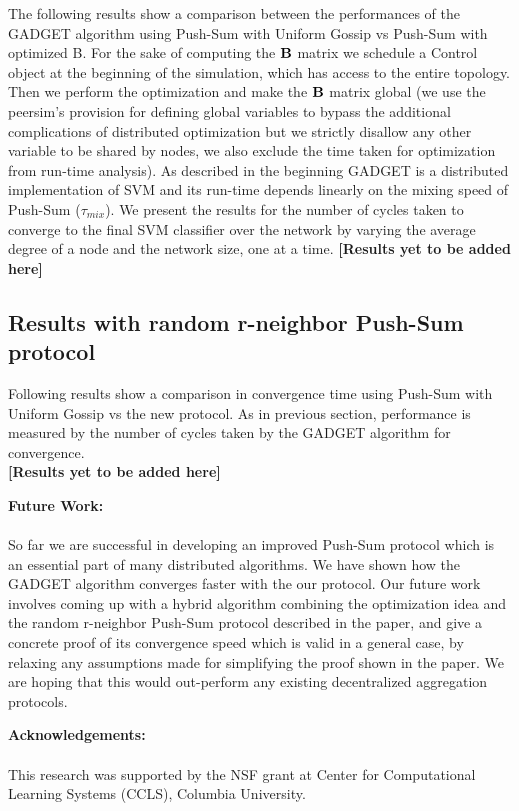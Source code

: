 \documentclass{article}
\begin{document}
The following results show a comparison between the performances of the GADGET algorithm using Push-Sum with Uniform Gossip vs Push-Sum with optimized B. For the sake of computing the $\bf{B}$ matrix we schedule a Control object at the beginning of the simulation, which has access to the entire topology. Then we perform the optimization and make the $\bf{B}$ matrix global (we use the peersim's provision for defining global variables to bypass the additional complications of distributed optimization but we strictly disallow any other variable to be shared by nodes, we also exclude the time taken for optimization from run-time analysis). As described in the beginning GADGET is a distributed implementation of SVM and its run-time depends linearly on the mixing speed of Push-Sum ($\tau_{mix}$). We present the results for the number of cycles taken to converge to the final SVM classifier over the network by varying the average degree of a node and the network size, one at a time.
\textbf{[Results yet to be added here]}

\subsection{Results with random r-neighbor Push-Sum protocol}

Following results show a comparison in convergence time using Push-Sum with Uniform Gossip vs the new protocol. As in previous section, performance is measured by the number of cycles taken by the GADGET algorithm for convergence. \\
\textbf{[Results yet to be added here]}

\textbf{Future Work:} \\ \\
So far we are successful in developing an improved Push-Sum protocol which is an essential part of many distributed algorithms. We have shown how the GADGET algorithm converges faster with the our protocol. Our future work involves coming up with a hybrid algorithm combining the optimization idea and the random r-neighbor Push-Sum protocol described in the paper, and give a concrete proof of its convergence speed which is valid in a general case, by relaxing any assumptions made for simplifying the proof shown in the paper. We are hoping that this would out-perform any existing decentralized aggregation protocols.

\textbf{Acknowledgements:} \\ \\
This research was supported by the NSF grant at Center for Computational Learning Systems (CCLS), Columbia University.
\end{document}
